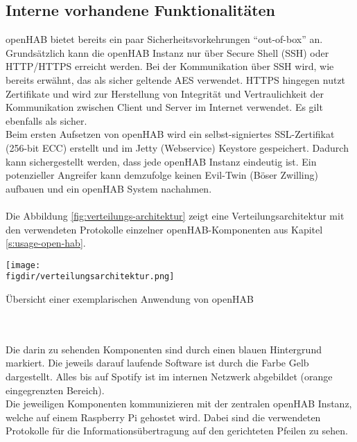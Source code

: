 \subsection{Interne vorhandene Funktionalitäten}
openHAB bietet bereits ein paar Sicherheitsvorkehrungen "`out-of-box"' an. Grundsätzlich kann die openHAB Instanz nur über Secure Shell (SSH) oder HTTP/HTTPS erreicht werden. Bei der Kommunikation über SSH wird, wie bereits erwähnt, das als sicher geltende AES verwendet. HTTPS hingegen nutzt Zertifikate und wird zur Herstellung von Integrität und Vertraulichkeit der Kommunikation zwischen Client und Server im Internet verwendet. Es gilt ebenfalls als sicher.\\
Beim ersten Aufsetzen von openHAB wird ein selbst-signiertes SSL-Zertifikat (256-bit ECC) erstellt und im Jetty (Webservice) Keystore gespeichert. Dadurch kann sichergestellt werden, dass jede openHAB Instanz eindeutig ist. Ein potenzieller Angreifer kann demzufolge keinen Evil-Twin (Böser Zwilling) aufbauen und ein openHAB System nachahmen.\\
\\
Die Abbildung \ref{fig:verteilungs-architektur} zeigt eine Verteilungsarchitektur mit den verwendeten Protokolle einzelner openHAB-Komponenten aus Kapitel \ref{s:usage-open-hab}.\\
\begin{minipage}{\textwidth}
	\centering
	\captionsetup{type=figure}
	\texttt{[image: \\figdir/verteilungsarchitektur.png]}
	\caption{Übersicht einer exemplarischen Anwendung von openHAB \label{fig:verteilungs-architektur}}
\end{minipage}
\\
\\
Die darin zu sehenden Komponenten sind durch einen blauen Hintergrund markiert. Die jeweils darauf laufende Software ist durch die Farbe Gelb dargestellt. Alles bis auf Spotify ist im internen Netzwerk abgebildet (orange eingegrenzten Bereich).\\
Die jeweiligen Komponenten kommunizieren mit der zentralen openHAB Instanz, welche auf einem Raspberry Pi gehostet wird. Dabei sind die verwendeten Protokolle für die Informationsübertragung auf den gerichteten Pfeilen zu sehen.

